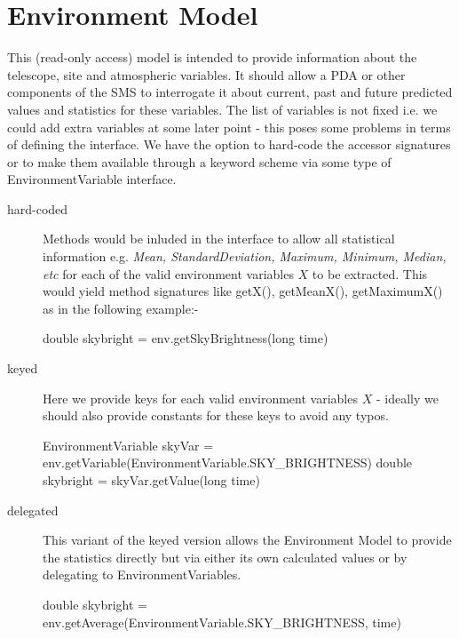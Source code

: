 \section{Environment Model}
This (read-only access) model is intended to provide information about the telescope, site and atmospheric variables. It should allow a PDA or other components of the SMS to interrogate it about current, past and future predicted values and statistics for these variables. The list of variables is not fixed i.e. we could add extra variables at some later point - this poses some problems in terms of defining the interface. We have the option to hard-code the accessor signatures or to make them available through a keyword scheme via some type of \textsf{EnvironmentVariable} interface.

\begin{description}
\item[hard-coded] Methods would be inluded in the interface to allow all statistical information e.g. \emph{Mean, StandardDeviation, Maximum, Minimum, Median, etc} for each of the valid environment variables $X$ to be extracted. This would yield method signatures like \textsf{getX(), getMeanX(), getMaximumX()} as in the following example:-

\textsf{double skybright = env.getSkyBrightness(long time)}

\item[keyed] Here we provide keys for each valid environment variables $X$ - ideally we should also provide constants for these keys to avoid any typos.

\textsf{EnvironmentVariable skyVar = env.getVariable(EnvironmentVariable.SKY\_BRIGHTNESS)}
\textsf{double skybright = skyVar.getValue(long time)}

\item[delegated] This variant of the keyed version allows the Environment Model to provide the statistics directly but via either its own calculated values or by delegating to \textsf{EnvironmentVariables}.

\textsf{double skybright = env.getAverage(EnvironmentVariable.SKY\_BRIGHTNESS, time)}

\end{description}

